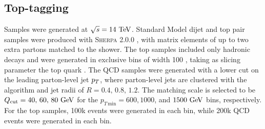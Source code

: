 \subsection{Top-tagging} \label{sec:top-samples}
Samples were generated at $\sqrt{s}=14\TeV$. Standard Model dijet and top pair
samples were produced with \textsc{Sherpa} 2.0.0 \cite{Gleisberg:2008ta,Schumann:2007mg,Krauss:2001iv,Gleisberg:2008fv,Hoeche:2009rj,Schonherr:2008av}, with matrix elements of up
to two extra partons matched to the shower. The top samples included only
hadronic decays and  were generated in exclusive \pt bins of width 100 \GeV,
taking as slicing parameter the top quark \pt. The QCD samples were generated
with a lower cut on the leading parton-level jet $p_T$, where parton-level jets
are clustered with the \antikt algorithm and jet radii of
$R= 0.4,\,0.8,\,1.2$. The matching scale is selected to be
$Q_{\rm cut}=40,\,60,\,80 \GeV$ for the $p_{T\,\text{min}}=600, 1000$, and
$1500 \GeV$ bins, respectively. For the top samples, 100k events were generated
in each bin, while 200k QCD events were generated in each bin.
